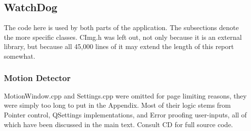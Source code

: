 \subsection{WatchDog}
The code here is used by both parts of the application. The subsections denote the more specific classes.
CImg.h was left out, not only because it is an external library, but because all 45,000 lines of it may extend the length of this report somewhat.

\begin{frame}{}

\end{frame}

\begin{frame}{}

\end{frame}

\begin{frame}{}

\end{frame}

\begin{frame}{}

\end{frame}

\begin{frame}{}

\end{frame}


\subsubsection{Motion Detector}
MotionWindow.cpp and Settings.cpp were omitted for page limiting reasons, they were simply too long to put in the Appendix. Most of their logic stems from Pointer control, QSettings implementations, and Error proofing user-inputs, all of which have been discussed in the main text.  Consult CD for full source code.

\vspace{-20pt}
\begin{frame}{}

\end{frame}

%

